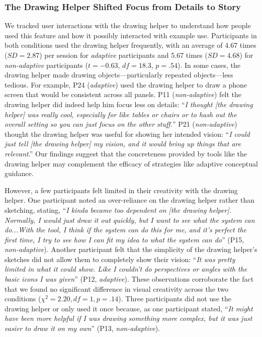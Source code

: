 \subsubsection{The Drawing Helper Shifted Focus from Details to Story}
We tracked user interactions with the drawing helper to understand how people used this feature and how it possibly interacted with example use. Participants in both conditions used the drawing helper frequently, with an average of 4.67 times ($SD=2.87$) per session for \textit{adaptive} participants and 5.67 times ($SD=4.68$) for \textit{non-adaptive} participants ($t=-0.63$, $df=18.3$, $p=.54$). In some cases, the drawing helper made drawing objects---particularly repeated objects---less tedious. For example, P24 (\textit{adaptive}) used the drawing helper to draw a phone screen that would be consistent across all panels. P11 (\textit{non-adaptive}) felt the drawing helper did indeed help him focus less on details: ``\textit{I thought [the drawing helper] was really cool, especially for like tables or chairs or to hash out the overall setting so you can just focus on the other stuff.}'' P21 (\textit{non-adaptive}) thought the drawing helper was useful for showing her intended vision: ``\textit{I could just tell [the drawing helper] my vision, and it would bring up things that are relevant}.'' 
Our findings suggest that the concreteness provided by tools like the drawing helper may complement the efficacy of strategies like adaptive conceptual guidance. 

However, a few participants felt limited in their creativity with the drawing helper. One participant noted an over-reliance on the drawing helper rather than sketching, stating, ``\textit{I kinda became too dependent on [the drawing helper]. Normally, I would just draw it out quickly, but I want to see what the system can do...With the tool, I think if the system can do this for me, and it's perfect the first time, I try to see how I can fit my idea to what the system can do}'' (P15, \textit{non-adaptive}). 
Another participant felt that the simplicity of the drawing helper's sketches did not allow them to completely show their vision: ``\textit{It was pretty limited in what it could show. Like I couldn't do perspectives or angles with the basic icons I was given}'' (P12, \textit{adaptive}). 
These observations corroborate the fact that we found no significant difference in visual creativity across the two conditions ($\chi^2=2.20, df=1, p=.14$).
Three participants did not use the drawing helper or only used it once because, as one participant stated, ``\textit{It might have been more helpful if I was drawing something more complex, but it was just easier to draw it on my own}'' (P13, \textit{non-adaptive}). 